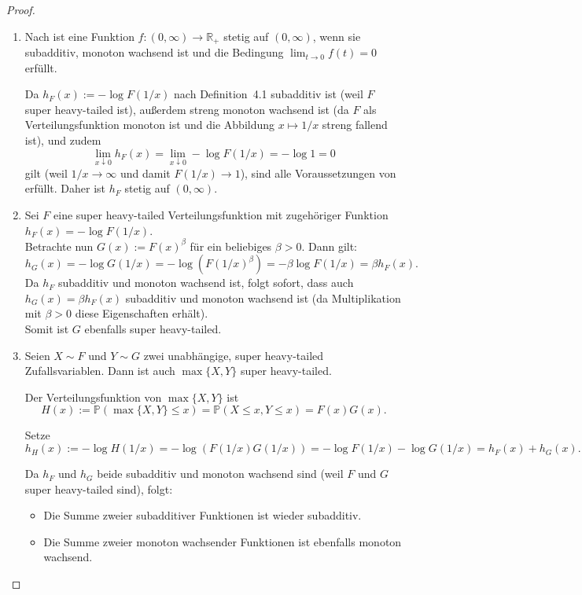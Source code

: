 \documentclass[
12pt,
fancyheadings, %
%
a4paper, 
%
]{tuhhreprt}
\begin{document}
\begin{proof}
\begin{enumerate}[label=\roman*)]
    \item Nach \cite[Remark~1]{matkowski1993subadditive} ist eine Funktion \( f : (0, \infty) \to \mathbb{R}_+ \) stetig auf \( (0, \infty) \), wenn sie subadditiv, monoton wachsend ist und die Bedingung \( \lim_{t \to 0} f(t) = 0 \) erfüllt. 

    Da \( h_F(x) := -\log F(1/x) \) nach Definition~4.1 subadditiv ist (weil \( F \) super heavy-tailed ist), außerdem streng monoton wachsend ist (da \( F \) als Verteilungsfunktion monoton ist und die Abbildung \( x \mapsto 1/x \) streng fallend ist), und zudem
    \[
    \lim_{x \downarrow 0} h_F(x) = \lim_{x \downarrow 0} -\log F(1/x) = -\log 1 = 0
    \]
    gilt (weil \( 1/x \to \infty \) und damit \( F(1/x) \to 1 \)), sind alle Voraussetzungen von \cite[Remark~1]{matkowski1993subadditive} erfüllt. Daher ist \( h_F \) stetig auf \( (0, \infty) \). \cite[Proposition 2, Proof i]{ChenShneer2024}

    \item Sei \( F \) eine super heavy-tailed Verteilungsfunktion mit zugehöriger Funktion \\ \( h_F(x) = -\log F(1/x) \).\\
    Betrachte nun \( G(x) := F(x)^\beta \) für ein beliebiges \( \beta > 0 \). Dann gilt:
    \[
    h_G(x) = -\log G(1/x) 
    = -\log \left( F(1/x)^\beta \right) 
    = -\beta \log F(1/x) 
    = \beta h_F(x).
    \]
    Da \( h_F \) subadditiv und monoton wachsend ist, folgt sofort, dass auch \( h_G(x) = \beta h_F(x) \) subadditiv und monoton wachsend ist (da Multiplikation mit \( \beta > 0 \) diese Eigenschaften erhält).\\
    Somit ist \( G \) ebenfalls super heavy-tailed.

        \item
    Seien \( X \sim F \) und \( Y \sim G \) zwei unabhängige, super heavy-tailed Zufallsvariablen. Dann ist auch \( \max\{X, Y\} \) super heavy-tailed.

    Der Verteilungsfunktion von \( \max\{X, Y\} \) ist
    \[
    H(x) := \mathbb{P}(\max\{X, Y\} \le x) = \mathbb{P}(X \le x, Y \le x) = F(x) G(x).
    \]

    Setze
    \[
    h_H(x) := -\log H(1/x) = -\log (F(1/x) G(1/x)) = -\log F(1/x) - \log G(1/x) = h_F(x) + h_G(x).
    \]

    Da \( h_F \) und \( h_G \) beide subadditiv und monoton wachsend sind (weil \( F \) und \( G \) super heavy-tailed sind), folgt:
    \begin{itemize}
        \item Die Summe zweier subadditiver Funktionen ist wieder subadditiv.
        \item Die Summe zweier monoton wachsender Funktionen ist ebenfalls monoton wachsend.
    \end{itemize}


\end{enumerate}
\end{proof}
\end{document}
